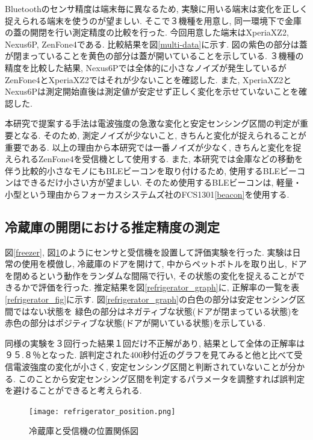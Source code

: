 \documentclass[Japanese]{dicomopapers}
\begin{document}
Bluetoothのセンサ精度は端末毎に異なるため, 実験に用いる端末は変化を正しく捉えられる端末を使うのが望ましい.
そこで３機種を用意し, 同一環境下で金庫の蓋の開閉を行い測定精度の比較を行った.
今回用意した端末はXperiaXZ2, Nexus6P, ZenFone4である.
比較結果を図\ref{multi-data}に示す.
図の紫色の部分は蓋が閉まっていることを黄色の部分は蓋が開いていることを示している.
３機種の精度を比較した結果, Nexus6Pでは全体的に小さなノイズが発生しているがZenFone4とXperiaXZ2ではそれが少ないことを確認した.
また, XperiaXZ2とNexus6Pは測定開始直後は測定値が安定せず正しく変化を示せていないことを確認した.

本研究で提案する手法は電波強度の急激な変化と安定センシング区間の判定が重要となる.
そのため, 測定ノイズが少ないこと, きちんと変化が捉えられることが重要である.
以上の理由から本研究では一番ノイズが少なく, きちんと変化を捉えられるZenFone4を受信機として使用する.
また, 本研究では金庫などの移動を伴う比較的小さなモノにもBLEビーコンを取り付けるため, 使用するBLEビーコンはできるだけ小さい方が望ましい.
そのため使用するBLEビーコンは, 軽量・小型という理由からフォーカスシステムズ社のFCS1301\ref{beacon}を使用する.


\subsection{冷蔵庫の開閉における推定精度の測定}
図\ref{freezer}, 図\ref{refrigerator_position}のようにセンサと受信機を設置して評価実験を行った.
実験は日常の使用を模倣し, 冷蔵庫のドアを開けて, 中からペットボトルを取り出し, ドアを閉めるという動作をランダムな間隔で行い, その状態の変化を捉えることができるかで評価を行った.
推定結果を図\ref{refrigerator_graph}に, 正解率の一覧を表\ref{refrigerator_fig}に示す.
図\ref{refrigerator_graph}の白色の部分は安定センシング区間ではない状態を 緑色の部分はネガティブな状態(ドアが閉まっている状態)を 赤色の部分はポジティブな状態(ドアが開いている状態)を示している.

同様の実験を３回行った結果１回だけ不正解があり, 結果として全体の正解率は９５.８％となった.
誤判定された400秒付近のグラフを見てみると他と比べて受信電波強度の変化が小さく, 安定センシング区間と判断されていないことが分かる.
このことから安定センシング区間を判定するパラメータを調整すれば誤判定を避けることができると考えられる.

\begin{figure}[ht]
    \centering
    \texttt{[image: refrigerator\_position.png]}
    \caption{冷蔵庫と受信機の位置関係図}
    \label{refrigerator_position}
\end{figure}
\end{document}
